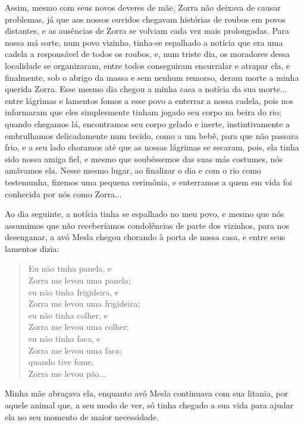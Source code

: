 Assim, mesmo com seus novos deveres de mãe, Zorra não deixava de causar problemas, já que aos nossos ouvidos chegavam histórias de roubos em povos distantes, e as ausências de Zorra se volviam cada vez mais prolongadas.
Para nossa má sorte, num povo vizinho, tinha-se espalhado a notícia que era uma cadela a responsável de todos os roubos, e, num triste dia, os moradores dessa localidade se organizaram, entre todos conseguiram encurralar e atrapar ela, e finalmente, sob o abrigo da massa e sem nenhum remorso, deram morte a minha querida Zorra.
Esse mesmo dia chegou a minha casa a notícia da sua morte... entre lágrimas e lamentos fomos a esse povo a enterrar a nossa cadela, pois nos informaram que eles simplesmente tinham jogado seu corpo na beira do rio; quando chegamos lá, encontramos seu corpo gelado e inerte, instintivamente a embrulhamos delicadamente num tecido, como a um bebê, para que não passara frio, e a seu lado choramos até que as nossas lágrimas se secaram, pois, ela tinha sido nossa amiga fiel, e mesmo que soubéssemos das suas más costumes, nós amávamos ela.
Nesse mesmo lugar, ao finalizar o dia e com o rio como testemunha, fizemos uma pequena cerimônia, e enterramos a quem em vida foi conhecida por nós como Zorra... 

Ao dia seguinte, a notícia tinha se espalhado no meu povo, e mesmo que nós assumimos que não receberíamos condolências de parte dos vizinhos, para nos desenganar, a avó Mesla chegou chorando à porta de nossa casa, e entre seus lamentos dizia:
\begin{quotation}
\noindent Eu não tinha panela, e \\Zorra me levou uma panela;\\ 
eu não tinha frigideira, e \\Zorra me levou uma frigideira;\\ 
eu não tinha colher, e \\Zorra me levou uma colher;\\
eu não tinha faca, e \\Zorra me levou uma faca;\\
quando tive fome, \\Zorra me levou pão...  
\end{quotation}
Minha mãe abraçava ela, enquanto avó Mesla continuava com sua litania, por aquele animal que, a seu modo de ver, só tinha chegado a sua vida para ajudar ela no seu momento de maior necessidade.
 

